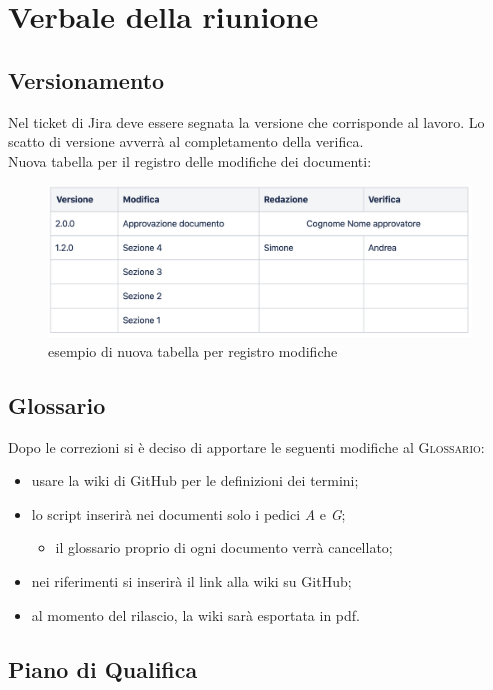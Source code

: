 \section{Verbale della riunione}
\subsection{Versionamento}
Nel ticket di Jira deve essere segnata la versione che corrisponde al lavoro. Lo scatto di versione avverrà al completamento della verifica.
\\Nuova tabella per il registro delle modifiche dei documenti:
\begin{figure}[H]
	\centering
	\includegraphics[scale=0.52]{res/images/tabella.png}
	\caption{esempio di nuova tabella per registro modifiche}
\end{figure}

\subsection{Glossario}
Dopo le correzioni si è deciso di apportare le seguenti modifiche al \textsc{Glossario}:
\begin{itemize}
	\item usare la wiki di GitHub per le definizioni dei termini;
	\item lo script inserirà nei documenti solo i pedici \textit{A} e \textit{G};
	\begin{itemize}
		\item il glossario proprio di ogni documento verrà cancellato;
	\end{itemize}
	\item nei riferimenti si inserirà il link alla wiki su GitHub;
	\item al momento del rilascio, la wiki sarà esportata in pdf.
\end{itemize}

\subsection{Piano di Qualifica}
